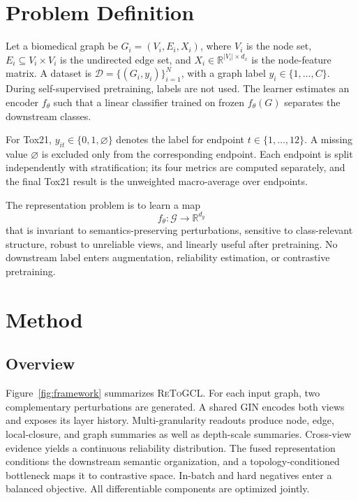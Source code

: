 \documentclass[10pt,twocolumn]{article}
\newcommand{\method}{\textsc{ReToGCL}}
\newcommand{\R}{\mathbb{R}}
\begin{document}
\section{Problem Definition}

Let a biomedical graph be $G_i=(V_i,E_i,X_i)$, where $V_i$ is the node set, $E_i\subseteq V_i\times V_i$ is the undirected edge set, and $X_i\in\R^{|V_i|\times d_x}$ is the node-feature matrix. A dataset is $\mathcal D=\{(G_i,y_i)\}_{i=1}^{N}$, with a graph label $y_i\in\{1,\ldots,C\}$. During self-supervised pretraining, labels are not used. The learner estimates an encoder $f_\theta$ such that a linear classifier trained on frozen $f_\theta(G)$ separates the downstream classes.

For Tox21, $y_{it}\in\{0,1,\varnothing\}$ denotes the label for endpoint $t\in\{1,\ldots,12\}$. A missing value $\varnothing$ is excluded only from the corresponding endpoint. Each endpoint is split independently with stratification; its four metrics are computed separately, and the final Tox21 result is the unweighted macro-average over endpoints.

The representation problem is to learn a map
\begin{equation}
f_\theta:\mathcal G\rightarrow\R^{d_g}
\end{equation}
that is invariant to semantics-preserving perturbations, sensitive to class-relevant structure, robust to unreliable views, and linearly useful after pretraining. No downstream label enters augmentation, reliability estimation, or contrastive pretraining.

\section{Method}

\subsection{Overview}

Figure~\ref{fig:framework} summarizes \method{}. For each input graph, two complementary perturbations are generated. A shared GIN encodes both views and exposes its layer history. Multi-granularity readouts produce node, edge, local-closure, and graph summaries as well as depth-scale summaries. Cross-view evidence yields a continuous reliability distribution. The fused representation conditions the downstream semantic organization, and a topology-conditioned bottleneck maps it to contrastive space. In-batch and hard negatives enter a balanced objective. All differentiable components are optimized jointly.
\end{document}
